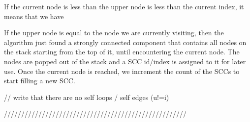\documentclass{l4proj}
\begin{document}
\noindent If the current node is less than the upper node is less than the current index, it means that we have 

\noindent If the upper node is equal to the node we are currently visiting, then the algorithm just found a strongly connected component that contains all nodes on the stack starting from the top of it, until encountering the current node. The nodes are popped out of the stack and a SCC id/index is assigned to it for later use. Once the current node is reached, we increment the count of the SCCs to start filling a new SCC.

\noindent // write that there are no self loops / self edges (u!=i)

 /////////////////////////////////////////////////////
\fi

\newpage
\end{document}
